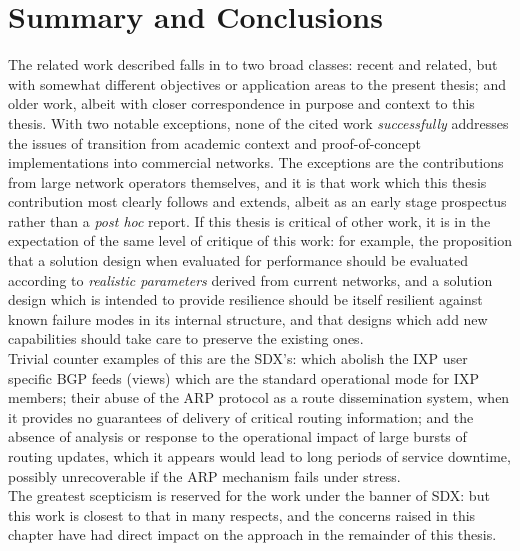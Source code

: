 \section{Summary and Conclusions}
The related work described falls in to two broad classes: recent and related, but with somewhat different objectives or application areas to the present thesis;
and older work, albeit with closer correspondence in purpose and context to this thesis.
With two notable exceptions, none of the cited work \emph{successfully} addresses the issues of transition from academic context and proof-of-concept implementations into commercial networks.
The exceptions are the contributions from large network operators themselves, and it is that work which this thesis contribution most clearly follows and extends,
albeit as an early stage prospectus rather than a \textit{post hoc} report.
If this thesis is critical of other work, it is in the expectation of the same level of critique of this work:
for example, the proposition that a solution design when evaluated for performance should be evaluated according to \emph{realistic parameters} derived from current networks,
and a solution design which is intended to provide resilience should be itself resilient against known failure modes in its internal structure,
and that designs which add new capabilities should take care to preserve the existing ones.
\\
Trivial counter examples of this are the SDX's: which abolish the IXP user specific BGP feeds (views) which are the standard operational mode for IXP members; their abuse of the ARP protocol as a route dissemination system, when it provides no guarantees of delivery of critical routing information; and the absence of analysis or response to the operational impact of large bursts of routing updates, which it appears would lead to long periods of service downtime, possibly unrecoverable if the ARP mechanism fails under stress.
\\
The greatest scepticism is reserved for the work under the banner of SDX: but this work is closest to that in many respects, and the concerns raised in this chapter have had direct impact on the approach in the remainder of this thesis.
